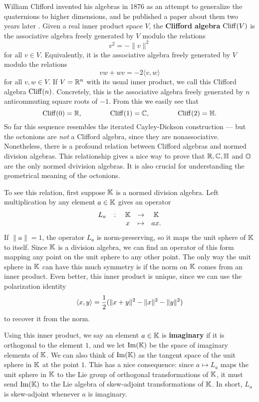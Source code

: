 William Clifford invented his algebras in 1876 as an attempt to
generalize the quaternions to higher dimensions, and he published a
paper about them two years later \cite{Clifford}.  Given a real inner
product space $V$, the {\bf Clifford algebra} ${\rm Cliff}(V)$ is the
associative algebra freely generated by $V$ modulo the relations
\[  v^2 = -\|v\|^2 \] 
for all $v \in V$.  Equivalently, it is the associative algebra 
freely generated by $V$ modulo the relations 
\[              vw + wv = -2\langle v,w\rangle    \]  
for all $v, w \in V$.  If $V = {\mathbb R}^n$ with its usual inner product, we 
call this Clifford algebra ${\rm Cliff}(n)$.  Concretely, this is the 
associative algebra freely generated by $n$ anticommuting square roots 
of $-1$.  From this we easily see that  
\[  {\rm Cliff}(0) = {\mathbb R}, \qquad\qquad {\rm Cliff}(1) = {\mathbb C}, \qquad\qquad    
{\rm Cliff}(2) = {\mathbb H} .\]   
So far this sequence resembles the iterated Cayley-Dickson construction 
--- but the octonions are {\it not} a Clifford algebra, since they are 
nonassociative.   Nonetheless, there is a profound relation between  
Clifford algebras and normed division algebras.  This relationship gives
a nice way to prove that ${\mathbb R}, {\mathbb C}, {\mathbb H}$ and ${\mathbb O}$ are the only normed  
dvivision algebras.  It is also crucial for understanding the  
geometrical meaning of the octonions.    
  
To see this relation, first suppose ${\mathbb K}$ is a normed division algebra.    
Left multiplication by any element $a \in {\mathbb K}$ gives an operator  
\[   \begin{array}{ccccc}  
       L_a &\colon& {\mathbb K} & \to   &  {\mathbb K}  \\  
           &     & x &\mapsto&   ax .   
\end{array} \]  
If $\|a\| = 1$, the operator $L_a$ is norm-preserving, so it maps the  
unit sphere of ${\mathbb K}$ to itself.  Since ${\mathbb K}$ is a division algebra, we can  
find an operator of this form mapping any point on the unit sphere to  
any other point.  The only way the unit sphere in ${\mathbb K}$ can have this much  
symmetry is if the norm on ${\mathbb K}$ comes from an inner product.  Even better,  
this inner product is unique, since we can use the polarization identity  
\[   \langle x, y\rangle = {1\over 2}(\|x+y\|^2 - \|x\|^2 - \|y\|^2) \]   
to recover it from the norm.     
  
Using this inner product, we say an element $a \in {\mathbb K}$ is {\bf imaginary}  
if it is orthogonal to the element $1$, and we let ${\rm Im}({\mathbb K})$ be the space  
of imaginary elements of ${\mathbb K}$.  We can also think of ${\rm Im}({\mathbb K})$ as the  
tangent space of the unit sphere in ${\mathbb K}$ at the point $1$.  This has a  
nice consequence: since $a \mapsto L_a$ maps the unit sphere in ${\mathbb K}$ to  
the Lie group of orthogonal transformations of ${\mathbb K}$, it must send  
${\rm Im}({\mathbb K})$ to the Lie algebra of skew-adjoint transformations of ${\mathbb K}$.  
In short, $L_a$ is skew-adjoint whenever $a$ is imaginary.  
  
